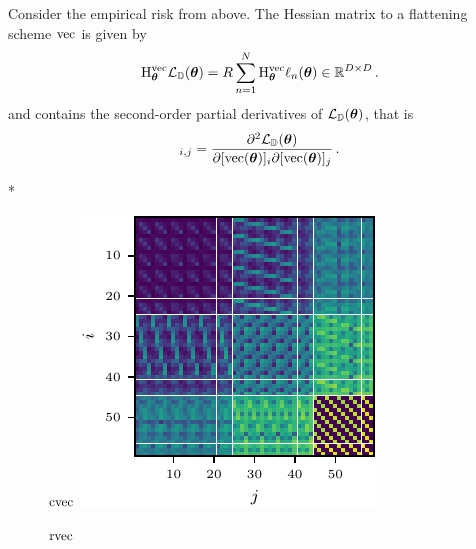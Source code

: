 Consider the empirical risk from above. The Hessian matrix \wrt to a flattening scheme $\vec$ is given by
\begin{align*}
  \hess_{\vtheta}^{\vec} \gL_{\sD}(\vtheta)
  =
  R
  \sum_{n=1}^N
  \hess_{\vtheta}^{\vec} \ell_n(\vtheta) \in \sR^{D \times D}\,.
\end{align*}
and contains the second-order partial derivatives of $\gL_{\sD}(\vtheta)$, that is
\begin{align*}
  [\hess_{\vtheta}^{\vec} \gL_{\sD}(\vtheta)]_{i,j}
  =
  \frac{\partial^2 \gL_{\sD}(\vtheta)}{\partial [\vec(\vtheta)]_i \partial [\vec(\vtheta)]_j}\,.
\end{align*}

\switchcolumn[1]*
\begin{figure}
  \centering
  \begin{minipage}[t]{0.495\linewidth}
    \centering
    $\cvec$\vspace{1ex}
    \includegraphics[width=\linewidth]{../kfs/plots/synthetic_cvec_hessian.pdf}
  \end{minipage}
  \hfill
  \begin{minipage}[t]{0.495\linewidth}
    \centering
    $\rvec$\vspace{1ex}

\end{minipage}
\end{figure}

